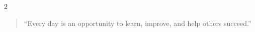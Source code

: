 \documentclass[10pt,a4paper,withhyper]{altacv}
\begin{document}
\begin{paracol}{2}
\divider

\newpage









\switchcolumn


\begin{quote}
``Every day is an opportunity to learn, improve, and help others succeed.''
\end{quote}










\end{paracol}
\end{document}
